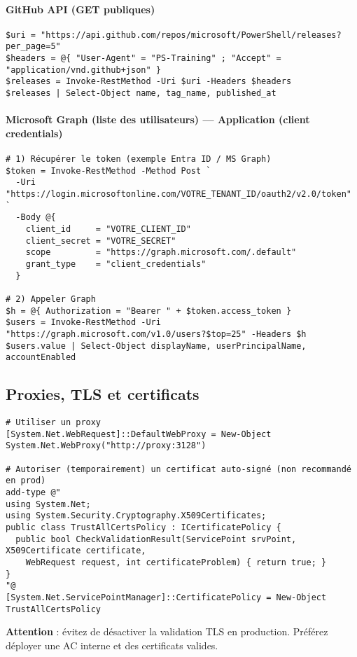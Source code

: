 \documentclass[a4paper,12pt]{article}
\begin{document}
\paragraph{GitHub API (GET publiques)}
\begin{verbatim}
$uri = "https://api.github.com/repos/microsoft/PowerShell/releases?per_page=5"
$headers = @{ "User-Agent" = "PS-Training" ; "Accept" = "application/vnd.github+json" }
$releases = Invoke-RestMethod -Uri $uri -Headers $headers
$releases | Select-Object name, tag_name, published_at
\end{verbatim}

\paragraph{Microsoft Graph (liste des utilisateurs) — Application (client credentials)}
\begin{verbatim}
# 1) Récupérer le token (exemple Entra ID / MS Graph)
$token = Invoke-RestMethod -Method Post `
  -Uri "https://login.microsoftonline.com/VOTRE_TENANT_ID/oauth2/v2.0/token" `
  -Body @{
    client_id     = "VOTRE_CLIENT_ID"
    client_secret = "VOTRE_SECRET"
    scope         = "https://graph.microsoft.com/.default"
    grant_type    = "client_credentials"
  }

# 2) Appeler Graph
$h = @{ Authorization = "Bearer " + $token.access_token }
$users = Invoke-RestMethod -Uri "https://graph.microsoft.com/v1.0/users?$top=25" -Headers $h
$users.value | Select-Object displayName, userPrincipalName, accountEnabled
\end{verbatim}

\subsection{Proxies, TLS et certificats}
\begin{verbatim}
# Utiliser un proxy
[System.Net.WebRequest]::DefaultWebProxy = New-Object System.Net.WebProxy("http://proxy:3128")

# Autoriser (temporairement) un certificat auto-signé (non recommandé en prod)
add-type @"
using System.Net;
using System.Security.Cryptography.X509Certificates;
public class TrustAllCertsPolicy : ICertificatePolicy {
  public bool CheckValidationResult(ServicePoint srvPoint, X509Certificate certificate,
    WebRequest request, int certificateProblem) { return true; }
}
"@
[System.Net.ServicePointManager]::CertificatePolicy = New-Object TrustAllCertsPolicy
\end{verbatim}
\begin{tcolorbox}[colback=red!5!white,colframe=red!70!black]
\textbf{Attention} : évitez de désactiver la validation TLS en production. Préférez déployer une AC interne et des certificats valides.
\end{tcolorbox}
\end{document}
